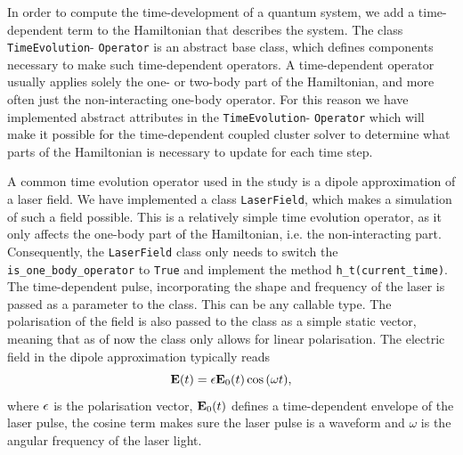 In order to compute the time-development of a quantum system, we add a
time-dependent term to the Hamiltonian that describes the system. The class 
\lstinline{TimeEvolution}- \lstinline{Operator}
is an abstract base class, which defines
components necessary to make such time-dependent operators. A time-dependent 
operator usually applies solely the one- or two-body part of the Hamiltonian, and 
more often just the non-interacting one-body operator. For this reason we have implemented 
abstract attributes in the \lstinline{TimeEvolution}- \lstinline{Operator}
which will make it 
possible for the time-dependent coupled cluster solver to determine what parts 
of the Hamiltonian is necessary to update for each time step.

A common time evolution operator used in the study is a dipole approximation of 
a laser field. We have implemented a class \lstinline{LaserField}, which makes 
a simulation of such a field possible. This is a relatively simple time evolution 
operator, as it only affects the one-body part of the Hamiltonian, i.e. the 
non-interacting part. Consequently, the \lstinline{LaserField} class only needs 
to switch the \lstinline{is_one_body_operator} to \lstinline{True} and implement 
the method \lstinline{h_t(current_time)}. The time-dependent pulse, incorporating the 
shape and frequency of the laser is passed as a parameter to the class. This can be 
any callable type. The polarisation of the field is also passed to the class 
as a simple static vector, meaning that as of now the class only allows for 
linear polarisation. 
The electric field in the dipole approximation typically 
reads
\begin{equation}
    \vb{E}(t) = \vb{\epsilon} \vb{E}_0(t)\cos{(\omega t)},
\end{equation}
where $\vb{\epsilon}$ is the polarisation vector, $\vb{E}_0(t)$ defines a time-dependent 
envelope of the laser pulse, the cosine term makes sure the laser pulse is
a waveform and
$\omega$ is the angular frequency of the laser light.

\begin{figure}    

\end{figure}
